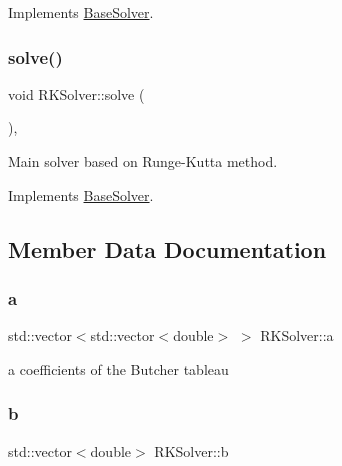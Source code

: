Implements \hyperlink{classBaseSolver_a66b4a8e6b6e0bb2f3564b2df849c79aa}{Base\+Solver}.

\mbox{\label{classRKSolver_aa251eaaa56b4ef39d95347579b8a6259}} 
\subsubsection{\texorpdfstring{solve()}{solve()}}
{\footnotesize\ttfamily void R\+K\+Solver\+::solve (\begin{DoxyParamCaption}{ }\end{DoxyParamCaption})\hspace{0.3cm}{\ttfamily [override]}, {\ttfamily [virtual]}}



Main solver based on Runge-\/\+Kutta method. 



Implements \hyperlink{classBaseSolver_a57f3b4ddec8693c61917aa37a2bac660}{Base\+Solver}.



\subsection{Member Data Documentation}
\mbox{\label{classRKSolver_ac5db53f1709b9db57f5ac9f41b54aa56}} 
\subsubsection{\texorpdfstring{a}{a}}
{\footnotesize\ttfamily std\+::vector$<$std\+::vector$<$double$>$ $>$ R\+K\+Solver\+::a\hspace{0.3cm}{\ttfamily [protected]}}



a coefficients of the Butcher tableau 

\mbox{\label{classRKSolver_a205a66e4ac1d479de5d7e0677ae32783}} 
\subsubsection{\texorpdfstring{b}{b}}
{\footnotesize\ttfamily std\+::vector$<$double$>$ R\+K\+Solver\+::b\hspace{0.3cm}{\ttfamily [protected]}}



